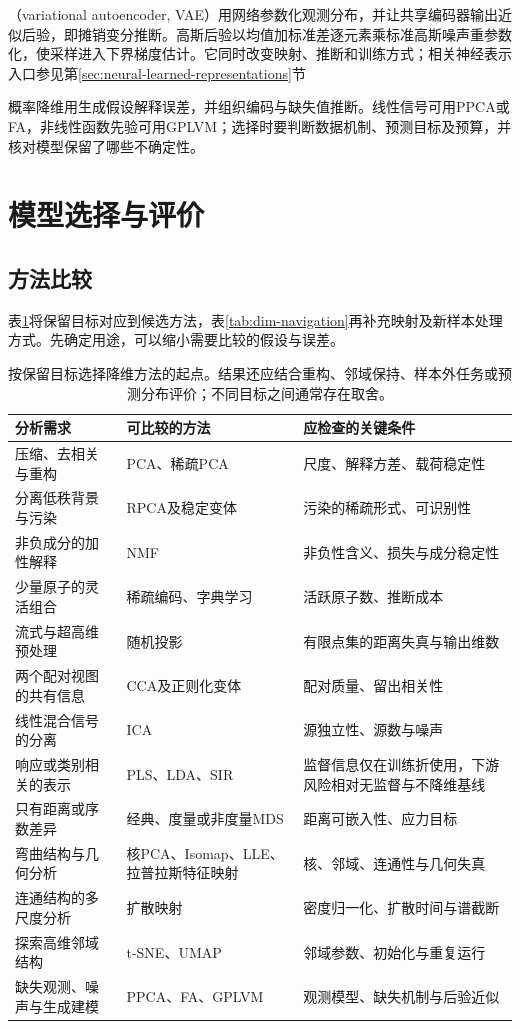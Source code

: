 （variational autoencoder, VAE）用网络参数化观测分布，并让共享编码器输出近似后验，即摊销变分推断。高斯后验以均值加标准差逐元素乘标准高斯噪声重参数化，使采样进入下界梯度估计。它同时改变映射、推断和训练方式；相关神经表示入口参见第\ref{sec:neural-learned-representations}节

概率降维用生成假设解释误差，并组织编码与缺失值推断。线性信号可用PPCA或FA，非线性函数先验可用GPLVM；选择时要判断数据机制、预测目标及预算，并核对模型保留了哪些不确定性。

\section{模型选择与评价}
\label{sec:dim-evaluation}

\subsection{方法比较}

表\ref{tab:dim-selection}将保留目标对应到候选方法，表\ref{tab:dim-navigation}再补充映射及新样本处理方式。先确定用途，可以缩小需要比较的假设与误差。

\begin{table}[!ht]
  \centering
  \small
  \begin{tabularx}{\linewidth}{@{}>{\RaggedRight\arraybackslash}X>{\RaggedRight\arraybackslash}X>{\RaggedRight\arraybackslash}X@{}}
    \toprule
    分析需求 & 可比较的方法 & 应检查的关键条件\\
    \midrule
    压缩、去相关与重构 & PCA、稀疏PCA & 尺度、解释方差、载荷稳定性\\
    分离低秩背景与污染 & RPCA及稳定变体 & 污染的稀疏形式、可识别性\\
    非负成分的加性解释 & NMF & 非负性含义、损失与成分稳定性\\
    少量原子的灵活组合 & 稀疏编码、字典学习 & 活跃原子数、推断成本\\
    流式与超高维预处理 & 随机投影 & 有限点集的距离失真与输出维数\\
    两个配对视图的共有信息 & CCA及正则化变体 & 配对质量、留出相关性\\
    线性混合信号的分离 & ICA & 源独立性、源数与噪声\\
    响应或类别相关的表示 & PLS、LDA、SIR & 监督信息仅在训练折使用，下游风险相对无监督与不降维基线\\
    只有距离或序数差异 & 经典、度量或非度量MDS & 距离可嵌入性、应力目标\\
    弯曲结构与几何分析 & 核PCA、Isomap、LLE、拉普拉斯特征映射 & 核、邻域、连通性与几何失真\\
    连通结构的多尺度分析 & 扩散映射 & 密度归一化、扩散时间与谱截断\\
    探索高维邻域结构 & t-SNE、UMAP & 邻域参数、初始化与重复运行\\
    缺失观测、噪声与生成建模 & PPCA、FA、GPLVM & 观测模型、缺失机制与后验近似\\
    \bottomrule
  \end{tabularx}
  \caption{按保留目标选择降维方法的起点。结果还应结合重构、邻域保持、样本外任务或预测分布评价；不同目标之间通常存在取舍。}
  \label{tab:dim-selection}
\end{table}

